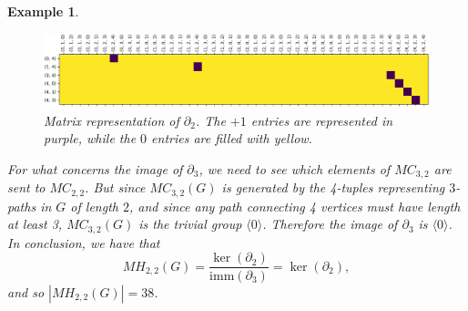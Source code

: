 \documentclass{article}
\newtheorem{example}[theorem]{Example}
\newcommand{\imm}{\mathrm{imm}}
\begin{document}
\begin{example}
		\begin{figure}
			\hspace{-1cm}
			\includegraphics[scale=0.45]{images/kernel_toy_example.png}
			\caption{Matrix representation of $\partial_2$. The $+1$ entries are represented in purple, while the $0$ entries are filled with yellow.}
		\end{figure}
		
		For what concerns the image of $\partial_3$, we need to see which elements of $MC_{3,2}$ are sent to $MC_{2,2}$.
		But since $MC_{3,2}(G)$ is generated by the 4-tuples representing $3$-paths in $G$ of length $2$, and since any path connecting 4 vertices must have length at least 3, $MC_{3,2}(G)$ is the trivial group $\langle 0 \rangle$.
		Therefore the image of $\partial_3$ is $\langle 0 \rangle$.
		In conclusion, we have that 
		\[
		MH_{2,2}(G)=\frac{\ker(\partial_2)}{\imm(\partial_3)}=\ker(\partial_2),
		\]
		and so $|MH_{2,2}(G)|=38$.
	\end{example}
	
\end{document}
